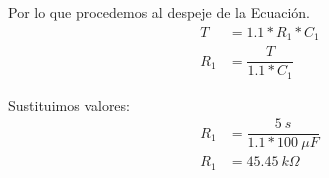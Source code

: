 \documentclass[osajnl,twocolumn,showpacs,superscriptaddress,10pt]{revtex4-1}
\begin{document}
Por lo que procedemos al despeje de la Ecuación.\\

\begin{align*}
T &= 1.1 * R_{1} * C_{1}\\
R_{1} &= \dfrac{T}{1.1 * C_{1}}
\end{align*}

Sustituimos valores:\\

\begin{align*}
R_{1} &= \dfrac{5 \ s}{1.1 * 100 \ \mu F}\\
R_{1} &= 45.45 \ k \Omega
\end{align*}










\end{document}
